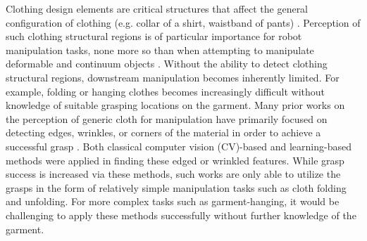 \documentclass[letterpaper, 10 pt, conference]{ieeeconf}  %
\begin{document}
Clothing design elements are critical structures that affect the general configuration of clothing (e.g. collar of a shirt, waistband of pants) \cite{hong2008eliciting}.
Perception of such clothing structural regions is of particular importance for robot manipulation tasks, none more so than when attempting to manipulate deformable and continuum objects \cite{jimenez2020perception}. Without the ability to detect clothing structural regions, downstream manipulation becomes inherently limited. For example, folding or hanging clothes becomes increasingly difficult without knowledge of suitable grasping locations on the garment.
Many prior works on the perception of generic cloth for manipulation have primarily focused on detecting edges, wrinkles, or corners of the material in order to achieve a successful grasp \cite{qian2020cloth, sun2015accurate, maitin2010cloth}. Both classical computer vision (CV)-based and learning-based methods were applied in finding these edged or wrinkled features.
While grasp success is increased via these methods, such works are only able to utilize the grasps in the form of relatively simple manipulation tasks such as cloth folding and unfolding. For more complex tasks such as garment-hanging, it would be challenging to apply these methods successfully without further knowledge of the garment.


\end{document}
